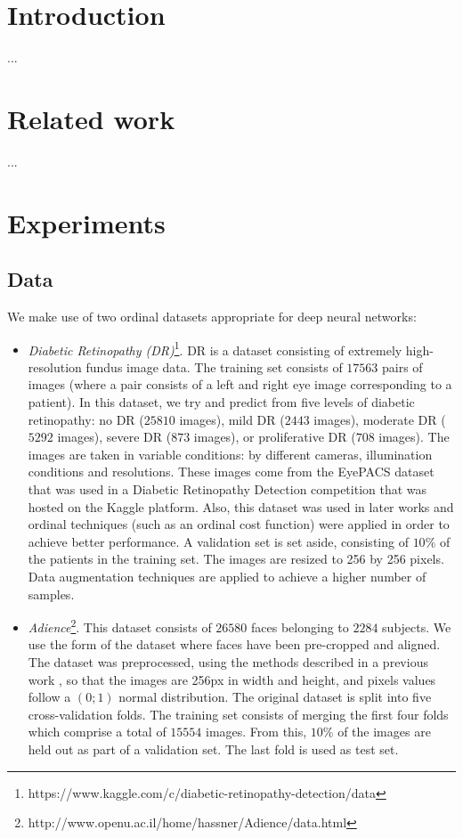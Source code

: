 \documentclass[10pt, a4paper, titlepage]{article}
\begin{document}
	\selectfont
	
	\begin{multicols}{2}
		
	\section{Introduction}
	...
		
	\section{Related work}
	...

	
	\section{Experiments}
	\subsection{Data}
	We make use of two ordinal datasets appropriate for deep neural networks:
	
	\begin{itemize}
		\item \textit{Diabetic Retinopathy (DR)}\footnote{https://www.kaggle.com/c/diabetic-retinopathy-detection/data}. DR is a dataset consisting of extremely high-resolution fundus image data. The training set consists of $17563$ pairs of images (where a  pair consists of a left and right eye image corresponding to a patient). In this dataset, we try and predict from five levels of diabetic retinopathy: no DR ($25810$ images), mild DR ($2443$ images), moderate DR ($5292$ images), severe DR ($873$ images), or proliferative DR ($708$ images). The images are taken in variable conditions: by different cameras, illumination conditions and resolutions. These images come from the EyePACS dataset that was used in a Diabetic Retinopathy Detection competition that was hosted on the Kaggle platform. Also, this dataset was used in later works \cite{de2018weighted} and ordinal techniques (such as an ordinal cost function) were applied in order to achieve better performance. A validation set is set aside, consisting of $10\%$ of the patients in the training set. The images are resized to 256 by 256 pixels. Data augmentation techniques are applied to achieve a higher number of samples.
		
		\item \textit{Adience}\footnote{http://www.openu.ac.il/home/hassner/Adience/data.html}. This dataset consists of $26580$ faces belonging to $2284$ subjects. We use the form of the dataset where faces have been pre-cropped and aligned. The dataset was preprocessed, using the methods described in a previous work \cite{beckham2017unimodal}, so that the images are 256px in width and height, and pixels values follow a $(0;1)$ normal distribution. The original dataset is split into five cross-validation folds. The training set consists of merging the first four folds which comprise a total of $15554$ images. From this, $10\%$ of the images are held out as part of a validation set. The last fold is used as test set.
	\end{itemize}
	

\end{multicols}
\end{document}

